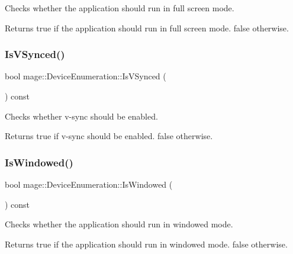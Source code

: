 Checks whether the application should run in full screen mode.

\begin{DoxyReturn}{Returns}
{\ttfamily true} if the application should run in full screen mode. {\ttfamily false} otherwise. 
\end{DoxyReturn}
\hypertarget{classmage_1_1_device_enumeration_a035e2430142e4e4ffcbc712f83e1e7e0}{}\label{classmage_1_1_device_enumeration_a035e2430142e4e4ffcbc712f83e1e7e0} 
\subsubsection{\texorpdfstring{Is\+V\+Synced()}{IsVSynced()}}
{\footnotesize\ttfamily bool mage\+::\+Device\+Enumeration\+::\+Is\+V\+Synced (\begin{DoxyParamCaption}{ }\end{DoxyParamCaption}) const}

Checks whether v-\/sync should be enabled.

\begin{DoxyReturn}{Returns}
{\ttfamily true} if v-\/sync should be enabled. {\ttfamily false} otherwise. 
\end{DoxyReturn}
\hypertarget{classmage_1_1_device_enumeration_a51479c8c85b286f78730c5622604e524}{}\label{classmage_1_1_device_enumeration_a51479c8c85b286f78730c5622604e524} 
\subsubsection{\texorpdfstring{Is\+Windowed()}{IsWindowed()}}
{\footnotesize\ttfamily bool mage\+::\+Device\+Enumeration\+::\+Is\+Windowed (\begin{DoxyParamCaption}{ }\end{DoxyParamCaption}) const}

Checks whether the application should run in windowed mode.

\begin{DoxyReturn}{Returns}
{\ttfamily true} if the application should run in windowed mode. {\ttfamily false} otherwise. 
\end{DoxyReturn}
\hypertarget{classmage_1_1_device_enumeration_a5950a6575d9073d6d23b228779f5ace1}{}\label{classmage_1_1_device_enumeration_a5950a6575d9073d6d23b228779f5ace1} 
